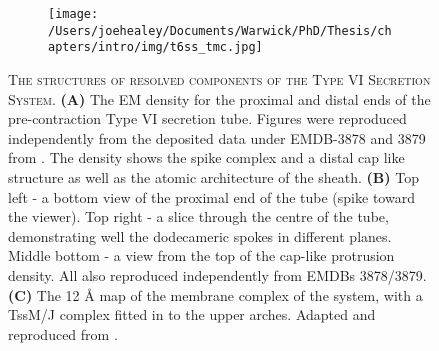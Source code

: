 \begin{figure}[p]
{{\begin{subfigure}[t]{0.58\textwidth}
            \centering
            \texttt{[image: /Users/joehealey/Documents/Warwick/PhD/Thesis/chapters/intro/img/t6ss\_tmc.jpg]}
            \captionsetup{singlelinecheck=off, justification=centering, font=footnotesize, aboveskip=5pt}
            \caption{}
            \label{t6ss3}
        \end{subfigure}%
  }\cr
}
\vfill
	\captionsetup{singlelinecheck=off, justification=justified, font=footnotesize, aboveskip=5pt}
	\caption[Type VI Secretion System Structures]{\textsc{\normalsize The structures of resolved components of the Type VI Secretion System.}\vspace{0.1cm} \newline \textbf{(A)} The EM density for the proximal and distal ends of the pre-contraction Type VI secretion tube. Figures were reproduced independently from the deposited data under EMDB-3878 and 3879 from \cite{Nazarov2017}. The density shows the spike complex and a distal cap like structure as well as the atomic architecture of the sheath. \textbf{(B)} Top left - a bottom view of the proximal end of the tube (spike toward the viewer). Top right - a slice through the centre of the tube, demonstrating well the dodecameric spokes in different planes. Middle bottom - a view from the top of the cap-like protrusion density. All also reproduced independently from \cite{Nazarov2017} EMDBs 3878/3879. \textbf{(C)} The 12 \AA{} map of the membrane complex of the system, with a TssM/J complex fitted in to the upper arches. Adapted and reproduced from \cite{Durand2015}.}
	\label{t6ss_structure}
\end{figure}

\clearpage

